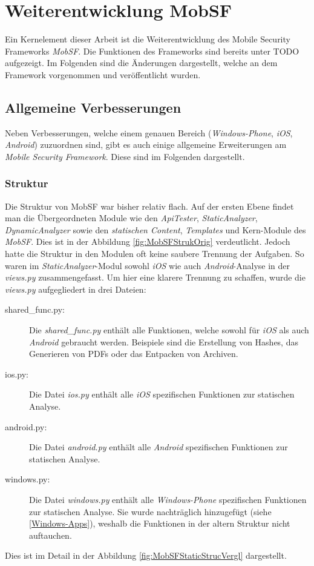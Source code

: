 \section{Weiterentwicklung MobSF}
\label{Weiterentwicklung MobSF}
Ein Kernelement dieser Arbeit ist die Weiterentwicklung des Mobile Security Frameworks \textit{MobSF}. Die Funktionen des Frameworks sind bereits unter TODO aufgezeigt. Im Folgenden sind die Änderungen dargestellt, welche an dem Framework vorgenommen und veröffentlicht wurden.

\subsection{Allgemeine Verbesserungen}
Neben Verbesserungen, welche einem genauen Bereich (\textit{Windows-Phone}, \textit{iOS}, \textit{Android}) zuzuordnen sind, gibt es auch einige allgemeine Erweiterungen am \textit{Mobile Security Framework}. Diese sind im Folgenden dargestellt.

\subsubsection{Struktur}
Die Struktur von MobSF war bisher relativ flach. Auf der ersten Ebene findet man die Übergeordneten Module wie den \textit{ApiTester}, \textit{StaticAnalyzer}, \textit{DynamicAnalyzer} sowie den \textit{statischen Content}, \textit{Templates} und Kern-Module des \textit{MobSF}. Dies ist in der Abbildung \ref{fig:MobSFStrukOrig} verdeutlicht. Jedoch hatte die Struktur in den Modulen oft keine saubere Trennung der Aufgaben. So waren im \textit{StaticAnalyzer}-Modul sowohl \textit{iOS} wie auch \textit{Android}-Analyse in der \textit{views.py} zusammengefasst. Um hier eine klarere Trennung zu schaffen, wurde die \textit{views.py} aufgegliedert in drei Dateien:
\begin{description}
	\item[shared\_func.py: ] Die \textit{shared\_func.py} enthält alle Funktionen, welche sowohl für \textit{iOS} als auch \textit{Android} gebraucht werden. Beispiele sind die Erstellung von Hashes, das Generieren von PDFs oder das Entpacken von Archiven.
	
	\item[ios.py: ] Die Datei \textit{ios.py} enthält alle \textit{iOS} spezifischen Funktionen zur statischen Analyse.
	
	\item[android.py: ] Die Datei \textit{android.py} enthält alle \textit{Android} spezifischen Funktionen zur statischen Analyse.
	
	\item[windows.py: ] Die Datei \textit{windows.py} enthält alle \textit{Windows-Phone} spezifischen Funktionen zur statischen Analyse. Sie wurde nachträglich hinzugefügt (siehe \ref{Windows-Apps}), weshalb die Funktionen in der altern Struktur nicht auftauchen.
\end{description}
Dies ist im Detail in der Abbildung \ref{fig:MobSFStaticStrucVergl} dargestellt.

